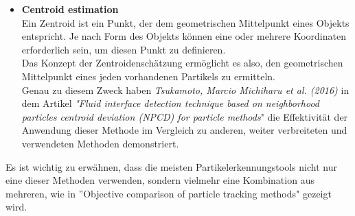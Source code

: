 \begin{itemize}
\item \textbf{Centroid estimation}\\
Ein Zentroid ist ein Punkt, der dem geometrischen Mittelpunkt eines Objekts entspricht. Je nach Form des Objekts können eine oder mehrere Koordinaten erforderlich sein, um diesen Punkt zu definieren.\\
Das Konzept der Zentroidenschätzung ermöglicht es also, den geometrischen Mittelpunkt eines jeden vorhandenen Partikels zu ermitteln.\\ 
Genau zu diesem Zweck haben \textit{Tsukamoto, Marcio Michiharu et al. (2016)} in dem Artikel \textit{"Fluid interface detection technique based on neighborhood particles centroid deviation (NPCD) for particle methods}"  \cite{tsukamoto2016fluid} die Effektivität der Anwendung dieser Methode im Vergleich zu anderen, weiter verbreiteten und verwendeten Methoden demonstriert.

\end{itemize}

Es ist wichtig zu erwähnen, dass die meisten Partikelerkennungstools nicht nur eine dieser Methoden verwenden, sondern vielmehr eine Kombination aus mehreren, wie in ''Objective comparison of particle tracking methods"   \cite{chenouard2014objective} gezeigt wird. 

